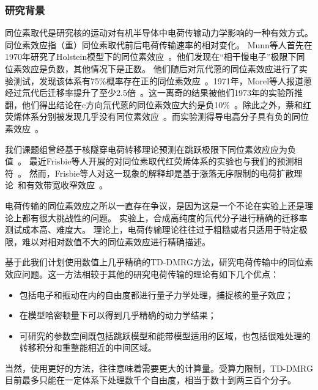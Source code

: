 \documentclass{article}
\begin{document}
\subsubsection{研究背景}
同位素取代是研究核的运动对有机半导体中电荷传输动力学影响的一种有效方式。同位素效应指（重）同位素取代前后电荷传输速率的相对变化。
Munn等人首先在1970年研究了Holstein模型下的同位素效应~\cite{Munn70}。他们发现在“相干慢电子”极限下同位素效应是负数，其他情况下是正数。
他们随后对氘代蒽的同位素效应进行了实验测试，发现该体系有75\%概率存在正的同位素效应~\cite{Munn70exp}。1971年，Morel等人报道蒽经过氘代后迁移率提升了至少2.5倍~\cite{Morel71}。这一离奇的结果被他们1973年的实验所推翻，他们得出结论在c方向氘代蒽的同位素效应大约是负10\%~\cite{Morel73}。除此之外，萘和红荧烯体系分别被发现几乎没有同位素效应~\cite{SCHEIN79, Xie13}。而实验测得导电高分子具有负的同位素效应~\cite{Shao14}。

我们课题组曾经基于核隧穿电荷转移理论预测在跳跃极限下同位素效应应为负值~\cite{NAN09, Jiang14, Jiang15, Jiang18}。
最近Frisbie等人开展的对同位素取代红荧烯体系的实验也与我们的预测相符~\cite{Ren17}。
然而，Frisbie等人对这一现象的解释却是基于涨落无序限制的电荷扩散理论~\cite{Fratini16, Troisi06}和有效带宽收窄效应~\cite{Hann041}。

电荷传输的同位素效应之所以一直存在争议，是因为这是一个不论在实验上还是理论上都有很大挑战性的问题。
实验上，合成高纯度的氘代分子进行精确的迁移率测试成本高、难度大。
理论上，电荷传输理论往往过于粗糙或者只适用于特定极限，难以对相对数值不大的同位素效应进行精确描述。

基于此我们计划使用数值上几乎精确的TD-DMRG方法，研究电荷传输中的同位素效应问题。这一方法相较于其他的研究电荷传输的理论有如下几个优点：
\begin{itemize}
    \item 包括电子和振动在内的自由度都进行量子力学处理，捕捉核的量子效应；
    \item 在模型哈密顿量下可以得到几乎精确的动力学结果；
    \item 可研究的参数空间既包括跳跃模型和能带模型适用的区域，也包括很难处理的转移积分和重整能相近的中间区域。
\end{itemize}

当然，使用更好的方法，往往意味着需要更大的计算量。受算力限制，TD-DMRG目前最多只能在一定体系下处理数千个自由度，相当于数十到两三百个分子。
\end{document}
